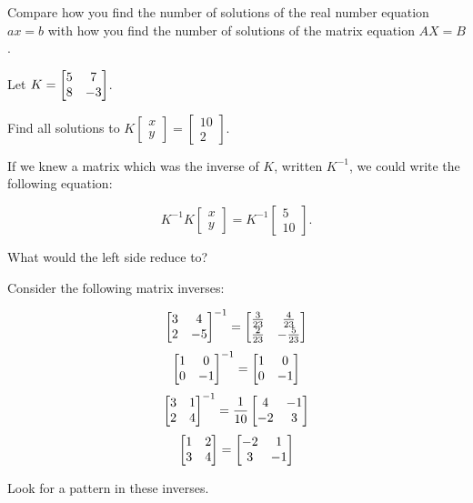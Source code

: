\documentclass[../gatm_answers.tex]{subfiles}
\begin{document}
\begin{inner_problem}
\item Compare how you find the number of solutions of the real number equation $ax=b$ with how you find the number of solutions of the matrix equation $AX=B$.
\end{inner_problem}

\begin{outer_problem}
\item Let $K=\begin{bmatrix} 5 & 7 \\ 8 & -3 \end{bmatrix}$.
\end{outer_problem}

\begin{inner_problem}[start=1]
\item Find all solutions to $K\left[\begin{array}{c} x \\ y \end{array}\right]=\left[\begin{array}{c} 10 \\ 2 \end{array}\right]$.
\end{inner_problem}

\begin{inner_problem}
\item If we knew a matrix which was the inverse of $K$, written $K^{-1}$, we could write the following equation:

$$K^{-1}K\left[\begin{array}{c} x \\ y \end{array}\right]=K^{-1}\left[\begin{array}{c} 5 \\ 10 \end{array}\right].$$

What would the left side reduce to?
\end{inner_problem}

\begin{outer_problem}
\item Consider the following matrix inverses:

$$\begin{bmatrix} 3 & 4 \\ 2 & -5 \end{bmatrix}^{-1}=\begin{bmatrix} \frac{3}{23} & \frac{4}{23} \\ \frac{2}{23} & -\frac{5}{23} \end{bmatrix}$$
$$\begin{bmatrix} 1 & 0 \\ 0 & -1 \end{bmatrix}^{-1}=\begin{bmatrix} 1 & 0 \\ 0 & -1 \end{bmatrix}$$
$$\begin{bmatrix} 3 & 1 \\ 2 & 4 \end{bmatrix}^{-1}=\frac{1}{10}\begin{bmatrix} 4 & -1 \\ -2 & 3 \end{bmatrix}$$
$$\begin{bmatrix} 1 & 2 \\ 3 & 4 \end{bmatrix} = \begin{bmatrix} -2 & 1 \\ 3 & -1 \end{bmatrix}$$
\end{outer_problem}

\begin{inner_problem}[start=1]
\item Look for a pattern in these inverses.
\end{inner_problem}
\end{document}
